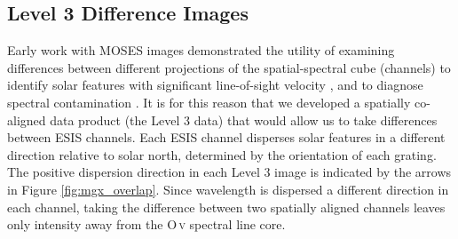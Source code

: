 		
	   
    \subsection{Level 3 Difference Images} \label{sec:dif_images} 
    	Early work with MOSES images demonstrated the utility of examining differences between different projections of the spatial-spectral cube (channels) to identify solar features with significant line-of-sight velocity \citep{Fox10,FoxPhD,RustPhD,Rust2019}, and to diagnose spectral contamination \citep{RustPhD, Rust2019}.
    	It is for this reason that we developed a spatially co-aligned data product (the Level 3 data) %
    	that would allow us to take differences between ESIS channels.
    	Each ESIS channel disperses solar features in a different direction relative to solar north, determined by the orientation of each grating.
    	The positive dispersion direction in each Level 3 image is indicated by the arrows  in Figure \ref{fig:mgx_overlap}.
    	Since wavelength is dispersed a different direction in each channel, taking the difference between two spatially aligned channels leaves only intensity away from the O\,\textsc{v} spectral line core.  
    	
